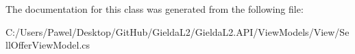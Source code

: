 The documentation for this class was generated from the following file\+:\begin{DoxyCompactItemize}
\item 
C\+:/\+Users/\+Pawel/\+Desktop/\+Git\+Hub/\+Gielda\+L2/\+Gielda\+L2.\+A\+P\+I/\+View\+Models/\+View/Sell\+Offer\+View\+Model.\+cs\end{DoxyCompactItemize}
